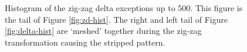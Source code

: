 \begin{figure}
	\centering

	\caption{\label{fig:ex-hist}Histogram of the zig-zag delta exceptions up to 500. This figure is the tail of Figure \ref{fig:zd-hist}. The right and left tail of Figure \ref{fig:delta-hist} are `meshed' together during the zig-zag transformation causing the stripped pattern.}
\end{figure}
